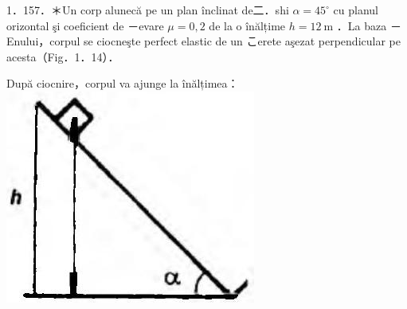 \documentclass[10pt]{article}
\begin{document}
1．157．＊Un corp alunecă pe un plan înclinat de二．shi $\alpha=45^{\circ}$ cu planul orizontal şi coeficient de －evare $\mu=0,2$ de la o înălțime $h=12 \mathrm{~m}$ ．La baza －Enului，corpul se ciocneşte perfect elastic de un こerete aşezat perpendicular pe acesta（Fig．1．14）．

După ciocnire，corpul va ajunge la înălțimea：\\
\includegraphics[max width=\textwidth, center]{2025_07_01_5b3ff9fa0d508c8e9f17g-037}
\end{document}
